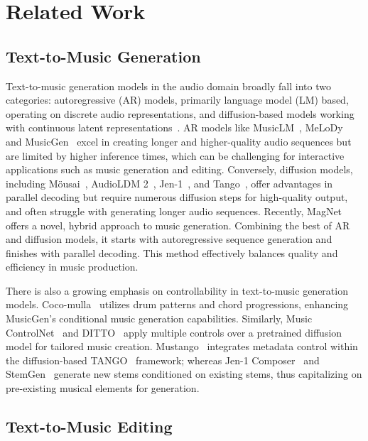 \section{Related Work}

\subsection{Text-to-Music Generation}

Text-to-music generation models in the audio domain broadly fall into two categories: autoregressive (AR) models, primarily language model (LM) based, operating on discrete audio representations, and diffusion-based models working with continuous latent representations~\cite{ddpm}. AR models like MusicLM~\cite{musiclm}, MeLoDy~\cite{melody} and MusicGen~\cite{musicgen} excel in creating longer and higher-quality audio sequences but are limited by higher inference times, which can be challenging for interactive applications such as music generation and editing. Conversely, diffusion models, including M{\"o}usai~\cite{mousai}, AudioLDM 2~\cite{audioldm2}, Jen-1~\cite{jen1}, and Tango~\cite{tango}, offer advantages in parallel decoding but require numerous diffusion steps for high-quality output, and often struggle with generating longer audio sequences. Recently, MagNet~\cite{magnet} offers a novel, hybrid approach to music generation. Combining the best of AR and diffusion models, it starts with autoregressive sequence generation and finishes with parallel decoding. This method effectively balances quality and efficiency in music production.

There is also a growing emphasis on controllability in text-to-music generation models. Coco-mulla~\cite{cocomulla} utilizes drum patterns and chord progressions, enhancing MusicGen's conditional music generation capabilities. Similarly, Music ControlNet~\cite{musicontrolnet} and DITTO~\cite{ditto} apply multiple controls over a pretrained diffusion model for tailored music creation. Mustango~\cite{mustango} integrates metadata control within the diffusion-based TANGO~\cite{tango} framework; whereas Jen-1 Composer~\cite{jen1composer} and StemGen~\cite{stemgen} generate new stems conditioned on existing stems, thus capitalizing on pre-existing musical elements for generation.

\subsection{Text-to-Music Editing}

